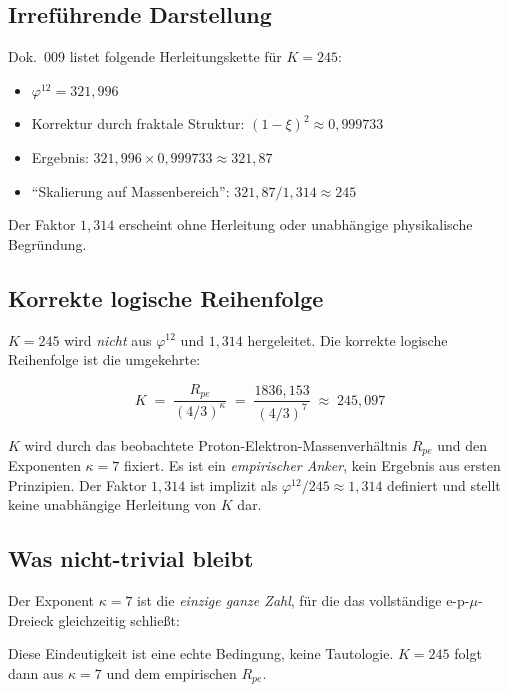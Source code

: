 \subsection*{Irreführende Darstellung}

Dok.~009 listet folgende Herleitungskette für $K = 245$:
\begin{itemize}
  \item $\varphi^{12} = 321{,}996$
  \item Korrektur durch fraktale Struktur: $(1-\xi)^2 \approx 0{,}999733$
  \item Ergebnis: $321{,}996 \times 0{,}999733 \approx 321{,}87$
  \item \enquote{Skalierung auf Massenbereich}: $321{,}87 / 1{,}314 \approx 245$
\end{itemize}
Der Faktor $1{,}314$ erscheint ohne Herleitung oder unabhängige
physikalische Begründung.

\subsection*{Korrekte logische Reihenfolge}

$K = 245$ wird \emph{nicht} aus $\varphi^{12}$ und $1{,}314$ hergeleitet.
Die korrekte logische Reihenfolge ist die umgekehrte:

\begin{equation}
  K \;=\; \frac{R_{pe}}{(4/3)^\kappa}
    \;=\; \frac{1836{,}153}{(4/3)^7}
    \;\approx\; 245{,}097
  \tag{190.14}
\end{equation}

$K$ wird durch das beobachtete Proton-Elektron-Massenverhältnis $R_{pe}$
und den Exponenten $\kappa = 7$ fixiert. Es ist ein \emph{empirischer Anker},
kein Ergebnis aus ersten Prinzipien. Der Faktor $1{,}314$ ist implizit
als $\varphi^{12} / 245 \approx 1{,}314$ definiert und stellt keine
unabhängige Herleitung von $K$ dar.

\subsection*{Was nicht-trivial bleibt}

Der Exponent $\kappa = 7$ ist die \emph{einzige ganze Zahl}, für die das
vollständige e-p-$\mu$-Dreieck gleichzeitig schließt:
\begin{center}
{\footnotesize
{}
}
\end{center}
Diese Eindeutigkeit ist eine echte Bedingung, keine Tautologie.
$K = 245$ folgt dann aus $\kappa = 7$ und dem empirischen $R_{pe}$.

